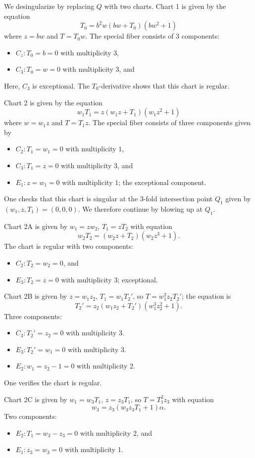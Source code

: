 \documentclass{article}
\theoremstyle{plain}
\theoremstyle{definition}
\theoremstyle{remark}
\begin{document}
We desingularize by replacing $Q$ with two charts. Chart 1 is given by the equation
\[
T_0 = b^2w(bw + T_0)(bw^2 + 1)
\]
where $z = bw$ and $T = T_0w$. The special fiber consists of 3 components:
\begin{itemize}
    \item $C_z: T_0 = b = 0$ with multiplicity 3,
    \item $C_3: T_0 = w = 0$ with multiplicity 3, and
\end{itemize}
Here, $C_3$ is exceptional. The $T_0$-derivative shows that this chart is regular.

Chart 2 is given by the equation
\[
w_1 T_1 = z(w_1z + T_1)(w_1 z^2 + 1)
\]
where $w = w_1 z$ and $T = T_1 z$. The special fiber consists of three components given by
\begin{itemize}
    \item $C_2: T_1 = w_1 = 0$ with multiplicity $1$,
    \item $C_3: T_1 = z = 0$ with multiplicity $3$, and
    \item $E_1: z = w_1 = 0$ with multiplicity $1$; the exceptional component.
\end{itemize}
One checks that this chart is singular at the 3-fold intersection point $Q_1$ given by $(w_1,z,T_1) = (0, 0, 0)$. We therefore continue by blowing up at $Q_1$.

Chart 2A is given by $w_1 = z w_2$, $T_1 = z T_2$ with equation 
\[
w_2T_2 = (w_2 z + T_2) (w_2 z^3 + 1).
\]
The chart is regular with two components:
\begin{itemize}
    \item $C_2: T_2 = w_2 = 0$, and
    \item $E_3: T_2 = z = 0$ with multiplicity 3; exceptional.
\end{itemize}

Chart 2B is given by $z = w_1 z_2$, $T_1 = w_1 T_2'$, so $T = w_1^2 z_2 T_2'$; the equation is
\[
T_2' = z_2 (w_1z_2 + T_2') (w_1^3 z_2^2 + 1).
\]
Three components:
\begin{itemize}
    \item $C_3: T_2' = z_2 = 0$ with multiplicity 3.
    \item $E_3: T_2' = w_1 = 0$ with multiplicity 3.
    \item $E_2: w_1 = z_2 - 1 = 0$ with multiplicity 2.
\end{itemize}
One verifies the chart is regular.

Chart 2C is given by $w_1 = w_3 T_1$, $z = z_3 T_1$, so $T = T_1^2 z_3$ with equation
\[
w_3 = z_3 (w_3 z_3 T_1 + 1) \alpha.
\]
Two components:
\begin{itemize}
    \item $E_2: T_1 = w_3 - z_3 = 0$ with multiplicity 2, and
    \item $E_1: z_3 = w_3 = 0$ with multiplicity 1.
\end{itemize}
\end{document}
